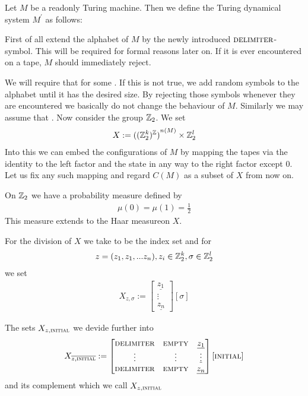 Let $M$ be a readonly Turing machine.
Then we define the Turing dynamical system $M^\prime$ as follows:

First of all extend the alphabet of $M$ by the newly introduced $\text{\scshape{delimiter}}$-symbol. This will be required for formal reasons later on. If it is ever encountered on a tape, $M$ should immediately reject.

We will require that  for some .
If this is not true, we add random symbols to the alphabet until it has the desired size. By rejecting those symbols whenever they are encountered we basically do not change the behaviour of $M$.
Similarly we may assume that .
Now consider the group $\mathbb{Z}_2$.
We set
\begin{align*}
	X := {{((\mathbb{Z}_2^{k})^{\mathbb{Z}})}^{n(M)}} \times \mathbb{Z}_2^l
\end{align*}
Into this we can embed the configurations of $M$ by mapping the tapes via the identity to the left factor and the state in any way to the right factor except $0$.
Let us fix any such mapping and regard $C(M)$ as a subset of $X$ from now on.

On $\mathbb{Z}_2$ we have a probability measure defined by
\begin{align*}
	\mu(0) = \mu(1) = \frac12
\end{align*}
This measure extends to the Haar measure\footnotemark on $X$.

For the division of $X$ we take  to be the index set and for
\begin{align*}
	z = (z_1,z_1,...z_n), z_i \in \mathbb{Z}_2^k, \sigma \in \mathbb{Z}_2^l
\end{align*}
we set
\begin{align*}
	X_{z,\sigma} :=
	\begin{bmatrix}
		\underline{z_{1}} \\
		\vdots \\
		\underline{z_{n}}
	\end{bmatrix} [ \sigma ]
\end{align*}

The sets $X_{z,\text{\scshape{initial}}}$ we devide further into
\begin{align*}
	X_{\overline{z,\text{\scshape{initial}}}} :=
	\begin{bmatrix}
		\text{\scshape{delimiter}} & \text{\scshape{empty}} & \underline{z_1} \\
		\vdots & \vdots & \underline\vdots \\
		\text{\scshape{delimiter}} & \text{\scshape{empty}} & \underline{z_n} \\
	\end{bmatrix} [ \text{\scshape{initial}} ]
\end{align*}
and its complement which we call $X_{z,\text{\scshape{initial}}}$

